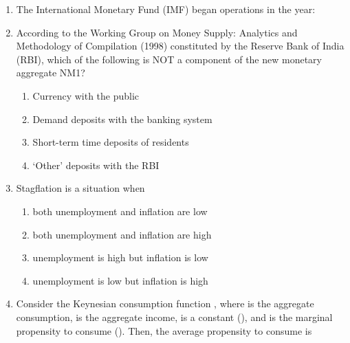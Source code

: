 \documentclass[12pt]{article}
\theoremstyle{remark}
\begin{document}
\begin{enumerate}
\begin{enumerate}
 \end{enumerate}
\hfill{}
\item   The International Monetary Fund (IMF) began operations in the year: 
\begin{enumerate}  \end{enumerate}
\hfill{}
\item   According to the Working Group on Money Supply: Analytics and Methodology of Compilation (1998) constituted by the Reserve Bank of India (RBI), which of the following is NOT a component of the new monetary aggregate NM1? 
\begin{enumerate}
\item   Currency with the public 
\item   Demand deposits with the banking system 
\item   Short-term time deposits of residents 
\item   ‘Other’ deposits with the RBI 
\end{enumerate}
\hfill{}
\item  Stagflation is a situation when 
\begin{enumerate} 
\item   both unemployment and inflation are low 
\item   both unemployment and inflation are high 
\item   unemployment is high but inflation is low 
\item   unemployment is low but inflation is high 
\end{enumerate}
\hfill{}
\item  Consider the Keynesian consumption function , where  is the aggregate consumption, \brak{ \gamma } is the aggregate income, \brak{ \alpha } is a constant (), and \brak{ \beta } is the marginal propensity to consume (). Then, the average propensity to consume is 
\begin{enumerate} \begin{multicols}{2}

\end{multicols}
\end{enumerate}
\end{enumerate}
\end{document}
